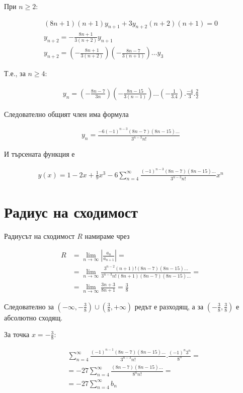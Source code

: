 \documentclass{article}
\begin{document}
При \( n \geq 2 \):

\begin{gather*}
    (8n + 1)(n+1)y_{n+1} + 3y_{n+2}(n+2)(n+1) = 0 \\
    y_{n+2} = -\frac{8n+1}{3(n+2)} y_{n+1} \\
    y_{n+2} = \left(-\frac{8n+1}{3(n+2)}\right) \left(-\frac{8n-7}{3(n+1)}\right) \ldots y_3
\end{gather*}

Т.е., за \( n \geq 4 \):

\begin{gather*}
    y_{n} = \left(-\frac{8n-7}{3n}\right) \left(-\frac{8n-15}{3(n-1)}\right) \ldots \left(-\frac{1}{3.4}\right).\frac{-4}{3}.\frac{2}{2}
\end{gather*}

Следователно общият член има формула

\begin{gather}
    y_n = \frac{-6(-1)^{n-3}(8n-7)(8n-15)...}{3^{n-3}n!}
\end{gather}

И търсената функция е

\begin{gather}
    y(x) = 1 - 2x + \frac{1}{9}x^3 - 6\sum_{n=4}^{\infty} \frac{(-1)^{n-3}(8n-7)(8n-15)...}{3^{n-3}n!} x^n
\end{gather}

\section*{Радиус на сходимост}

Радиусът на сходимост \( R \) намираме чрез

\begin{align*}
    R &= \lim_{n \to \infty} \left\vert \frac{a_n}{a_{n+1}} \right\vert = \\
    &= \lim_{n \to \infty} \frac{3^{n-2}(n+1)!(8n-7)(8n-15)...}{3^{n-3}n!(8n+1)(8n-7)(8n-15)...} = \\
    &= \lim_{n \to \infty} \frac{3n + 3}{8n + 1} = \frac{3}{8}
\end{align*}

Следователно за \( \left(-\infty, -\frac{3}{8}\right) \cup \left(\frac{3}{8}, +\infty\right) \) редът е разходящ, а за \( \left( -\frac{3}{8}, \frac{3}{8} \right) \) е абсолютно сходящ.

За точка \( x = -\frac{3}{8} \):

\begin{align*}
    &\, \sum_{n=4}^{\infty}\frac{(-1)^{n-1}(8n-7)(8n-15)...}{3^{n-3}n!}.\frac{(-1)^n3^n}{8^n} = \\
    &= -27\sum_{n=4}^{\infty}\frac{(8n-7)(8n-15)...}{8^nn!} = \\
    &= -27\sum_{n=4}^{\infty} b_n
\end{align*}
\end{document}
